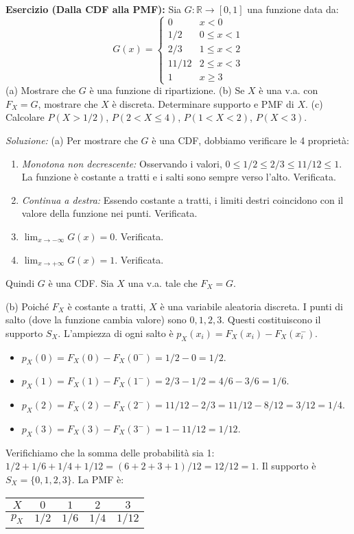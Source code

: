 \begin{example}
\textbf{Esercizio (Dalla CDF alla PMF):}
Sia $G: \mathbb{R} \to [0,1]$ una funzione data da:
\[ G(x) = \begin{cases} 0 & x < 0 \\ 1/2 & 0 \le x < 1 \\ 2/3 & 1 \le x < 2 \\ 11/12 & 2 \le x < 3 \\ 1 & x \ge 3 \end{cases} \]
(a) Mostrare che $G$ è una funzione di ripartizione.
(b) Se $X$ è una v.a. con $F_X=G$, mostrare che $X$ è discreta. Determinare supporto e PMF di $X$.
(c) Calcolare $P(X > 1/2)$, $P(2 < X \le 4)$, $P(1 < X < 2)$, $P(X < 3)$.

\textit{Soluzione:}
(a) Per mostrare che $G$ è una CDF, dobbiamo verificare le 4 proprietà:
    \begin{enumerate}
        \item \textit{Monotona non decrescente:} Osservando i valori, $0 \le 1/2 \le 2/3 \le 11/12 \le 1$. La funzione è costante a tratti e i salti sono sempre verso l'alto. Verificata.
        \item \textit{Continua a destra:} Essendo costante a tratti, i limiti destri coincidono con il valore della funzione nei punti. Verificata.
        \item $\lim_{x \to -\infty} G(x) = 0$. Verificata.
        \item $\lim_{x \to +\infty} G(x) = 1$. Verificata.
    \end{enumerate}
    Quindi $G$ è una CDF. Sia $X$ una v.a. tale che $F_X=G$.

(b) Poiché $F_X$ è costante a tratti, $X$ è una variabile aleatoria discreta. I punti di salto (dove la funzione cambia valore) sono $0, 1, 2, 3$. Questi costituiscono il supporto $S_X$.
L'ampiezza di ogni salto è $p_X(x_i) = F_X(x_i) - F_X(x_i^-)$.
    \begin{itemize}
        \item $p_X(0) = F_X(0) - F_X(0^-) = 1/2 - 0 = 1/2$.
        \item $p_X(1) = F_X(1) - F_X(1^-) = 2/3 - 1/2 = 4/6 - 3/6 = 1/6$.
        \item $p_X(2) = F_X(2) - F_X(2^-) = 11/12 - 2/3 = 11/12 - 8/12 = 3/12 = 1/4$.
        \item $p_X(3) = F_X(3) - F_X(3^-) = 1 - 11/12 = 1/12$.
    \end{itemize}
    Verifichiamo che la somma delle probabilità sia 1: $1/2 + 1/6 + 1/4 + 1/12 = (6+2+3+1)/12 = 12/12 = 1$.
    Il supporto è $S_X = \{0, 1, 2, 3\}$. La PMF è:
    \begin{center}
    \begin{tabular}{c|cccc}
    $X$ & $0$ & $1$ & $2$ & $3$ \\
    \hline
    $p_X$ & $1/2$ & $1/6$ & $1/4$ & $1/12$ \\
    \end{tabular}
    \end{center}


\end{example}
